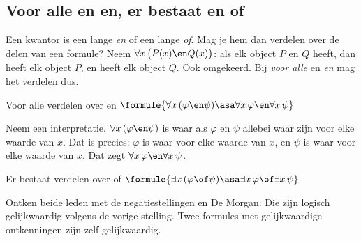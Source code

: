 \subsection{Voor alle en en, er bestaat en of}

Een kwantor is een lange \textit{en} of een lange \textit{of}. Mag je hem dan verdelen over de delen van een formule? Neem $\forall x\, \bigl(P(x) \en Q(x)\bigr)$: als elk object $P$ en $Q$ heeft, dan heeft elk object $P$, en heeft elk object $Q$. Ook omgekeerd. Bij \textit{voor alle} en \textit{en} mag het verdelen dus.

\begin{theorie}
\begin{stelling}{Voor alle verdelen over en}
\qquad $\formule{\forall x\, (\varphi \en \psi) \asa \forall x\, \varphi \en \forall x\, \psi}$
\end{stelling}

\begin{bewijs}
Neem een interpretatie. $\forall x\, (\varphi \en \psi)$ is waar als $\varphi$ en $\psi$ allebei waar zijn voor elke waarde van $x$. Dat is precies: $\varphi$ is waar voor elke waarde van $x$, en $\psi$ is waar voor elke waarde van $x$. Dat zegt $\forall x\, \varphi \en \forall x\, \psi$.
\end{bewijs}

\begin{stelling}{Er bestaat verdelen over of}
\qquad $\formule{\exists x\, (\varphi \of \psi) \asa \exists x\, \varphi \of \exists x\, \psi}$
\end{stelling}

\begin{bewijs}
Ontken beide leden met de negatiestellingen en De Morgan:
Die zijn logisch gelijkwaardig volgens de vorige stelling. Twee formules met gelijkwaardige ontkenningen zijn zelf gelijkwaardig.
\end{bewijs}
\end{theorie}


